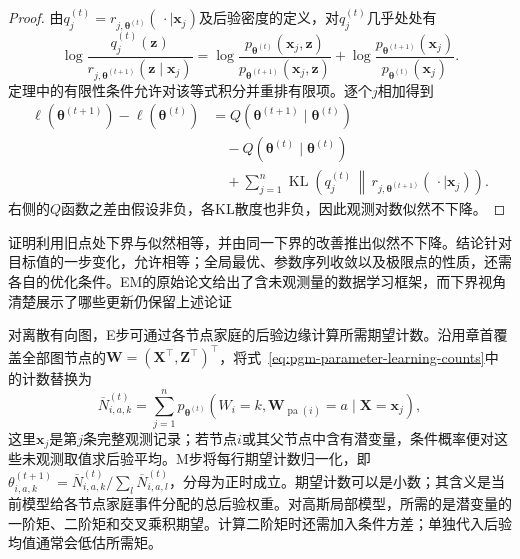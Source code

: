 \begin{proof}
  由$q_j^{(t)}=r_{j,\bm{\theta}^{(t)}}(\,\cdot\mid\bm{x}_j)$及后验密度的定义，对$q_j^{(t)}$几乎处处有
  \[
    \log\frac{q_j^{(t)}(\bm{z})}
                  {r_{j,\bm{\theta}^{(t+1)}}(\bm{z}\mid\bm{x}_j)}
    =
    \log\frac{p_{\bm{\theta}^{(t)}}(\bm{x}_j,\bm{z})}
                  {p_{\bm{\theta}^{(t+1)}}(\bm{x}_j,\bm{z})}
    +\log\frac{p_{\bm{\theta}^{(t+1)}}(\bm{x}_j)}
                   {p_{\bm{\theta}^{(t)}}(\bm{x}_j)}.
  \]
  定理中的有限性条件允许对该等式积分并重排有限项。逐个$j$相加得到
  \[
    \begin{aligned}
      \ell(\bm{\theta}^{(t+1)})-\ell(\bm{\theta}^{(t)})
      &=
      Q(\bm{\theta}^{(t+1)}\mid\bm{\theta}^{(t)})\\
      &\quad-Q(\bm{\theta}^{(t)}\mid\bm{\theta}^{(t)})\\
      &\quad+\sum_{j=1}^n
        \operatorname{KL}\!\left(
          q_j^{(t)}\,\middle\|\,
          r_{j,\bm{\theta}^{(t+1)}}(\,\cdot\mid\bm{x}_j)
        \right).
    \end{aligned}
  \]
  右侧的$Q$函数之差由假设非负，各KL散度也非负，因此观测对数似然不下降。
\end{proof}

证明利用旧点处下界与似然相等，并由同一下界的改善推出似然不下降。结论针对目标值的一步变化，允许相等；全局最优、参数序列收敛以及极限点的性质，还需各自的优化条件。EM的原始论文给出了含未观测量的数据学习框架，而下界视角清楚展示了哪些更新仍保留上述论证

对离散有向图，E步可通过各节点家庭的后验边缘计算所需期望计数。沿用章首覆盖全部图节点的$\bm{W}=(\bm{X}^\top,\bm{Z}^\top)^\top$，将式~\eqref{eq:pgm-parameter-learning-counts}中的计数替换为
\begin{equation}
  \overline N_{i,a,k}^{(t)}
    =\sum_{j=1}^n
      p_{\bm{\theta}^{(t)}}\!
        \left(W_i=k,\bm{W}_{\operatorname{pa}(i)}=a
                    \mid\bm{X}=\bm{x}_j\right),
  \label{eq:pgm-parameter-learning-expected-counts}
\end{equation}
这里$\bm{x}_j$是第$j$条完整观测记录；若节点$i$或其父节点中含有潜变量，条件概率便对这些未观测取值求后验平均。M步将每行期望计数归一化，即$\theta_{i,a,k}^{(t+1)}=\overline N_{i,a,k}^{(t)}/\sum_l\overline N_{i,a,l}^{(t)}$，分母为正时成立。期望计数可以是小数；其含义是当前模型给各节点家庭事件分配的总后验权重。对高斯局部模型，所需的是潜变量的一阶矩、二阶矩和交叉乘积期望。计算二阶矩时还需加入条件方差；单独代入后验均值通常会低估所需矩。

